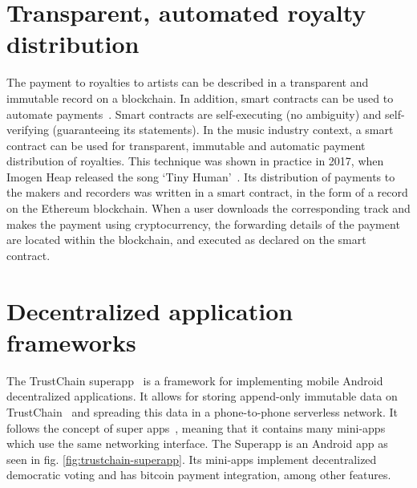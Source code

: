 \section{Transparent, automated royalty distribution}
\label{sec:smart-contracts}
The payment to royalties to artists can be described in a transparent and immutable record on a blockchain. In addition, smart contracts can be used to automate payments~\citep{buterin2014next}. Smart contracts are self-executing (no ambiguity) and self-verifying (guaranteeing its statements). In the music industry context, a smart contract can be used for transparent, immutable and automatic payment distribution of royalties. This technique was shown in practice in 2017, when Imogen Heap released the song `Tiny Human'~\citep{heap2017blockchain}. Its distribution of payments to the makers and recorders was written in a smart contract, in the form of a record on the Ethereum blockchain. When a user downloads the corresponding track and makes the payment using cryptocurrency, the forwarding details of the payment are located within the blockchain, and executed as declared on the smart contract.

\section{Decentralized application frameworks}
\label{sec:sote-trustchain}
The TrustChain superapp~\citep{mattskala2020} is a framework for implementing mobile Android decentralized applications. It allows for storing append-only immutable data on TrustChain~\citep{otte2017trustchain} and spreading this data in a phone-to-phone serverless network. It follows the concept of super apps~\citep{kpmg2019superapps}, meaning that it contains many mini-apps which use the same networking interface. The Superapp is an Android app as seen in fig. \ref{fig:trustchain-superapp}. Its mini-apps implement decentralized democratic voting and has bitcoin payment integration, among other features.

